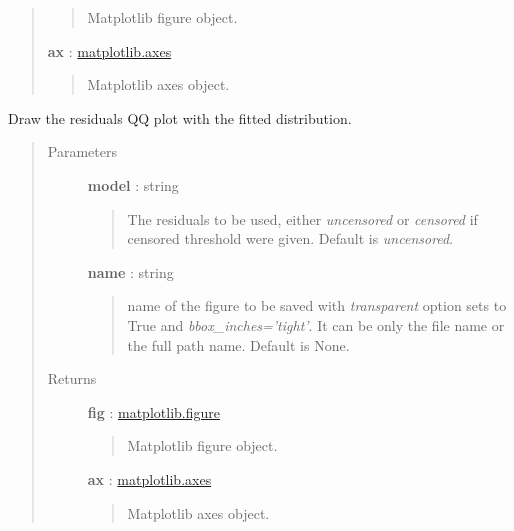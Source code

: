 \documentclass[letterpaper,10pt,english]{sphinxmanual}
\begin{document}
\begin{fulllineitems}
\begin{fulllineitems}
\begin{quote}
\begin{description}
\begin{quote}
Matplotlib figure object.
\end{quote}

\textbf{ax} : \href{http://matplotlib.org/api/axes\_api.html}{matplotlib.axes}
\begin{quote}

Matplotlib axes object.
\end{quote}

\end{description}\end{quote}

\end{fulllineitems}


\begin{fulllineitems}
\label{_generated/otpod.UnivariateLinearModelAnalysis:otpod.UnivariateLinearModelAnalysis.drawResidualsQQplot}
Draw the residuals QQ plot with the fitted distribution.
\begin{quote}\begin{description}
\item[{Parameters}] \leavevmode
\textbf{model} : string
\begin{quote}

The residuals to be used, either \emph{uncensored} or
\emph{censored} if censored threshold were given. Default is \emph{uncensored}.
\end{quote}

\textbf{name} : string
\begin{quote}

name of the figure to be saved with \emph{transparent} option sets to True
and \emph{bbox\_inches='tight'}. It can be only the file name or the 
full path name. Default is None.
\end{quote}

\item[{Returns}] \leavevmode
\textbf{fig} : \href{http://matplotlib.org/api/figure\_api.html}{matplotlib.figure}
\begin{quote}

Matplotlib figure object.
\end{quote}

\textbf{ax} : \href{http://matplotlib.org/api/axes\_api.html}{matplotlib.axes}
\begin{quote}

Matplotlib axes object.
\end{quote}


\end{description}
\end{quote}
\end{fulllineitems}
\end{fulllineitems}
\end{document}
